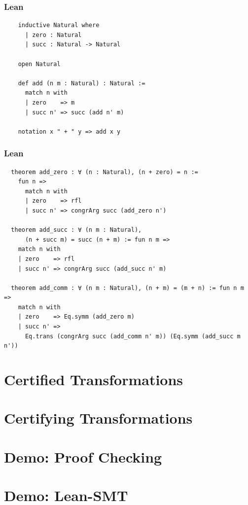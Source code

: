 \documentclass[usepdftitle=false,aspectratio=169,usenames,dvipsnames]{beamer}
\begin{document}
\begin{frame}[fragile]
  \frametitle{Lean}
  \begin{verbatim}
    inductive Natural where
      | zero : Natural
      | succ : Natural -> Natural

    open Natural

    def add (n m : Natural) : Natural :=
      match n with
      | zero    => m
      | succ n' => succ (add n' m)

    notation x " + " y => add x y
  \end{verbatim}
\end{frame}

\begin{frame}[fragile]
  \frametitle{Lean}
  \begin{verbatim}
  theorem add_zero : ∀ (n : Natural), (n + zero) = n :=
    fun n =>
      match n with
      | zero    => rfl
      | succ n' => congrArg succ (add_zero n')

  theorem add_succ : ∀ (n m : Natural),
      (n + succ m) = succ (n + m) := fun n m =>
    match n with
    | zero    => rfl
    | succ n' => congrArg succ (add_succ n' m)

  theorem add_comm : ∀ (n m : Natural), (n + m) = (m + n) := fun n m =>
    match n with
    | zero    => Eq.symm (add_zero m)
    | succ n' =>
      Eq.trans (congrArg succ (add_comm n' m)) (Eq.symm (add_succ m n'))
  \end{verbatim}
\end{frame}

\section{Certified Transformations}

\section{Certifying Transformations}

\section{Demo: Proof Checking}

\section{Demo: Lean-SMT}

\end{document}
